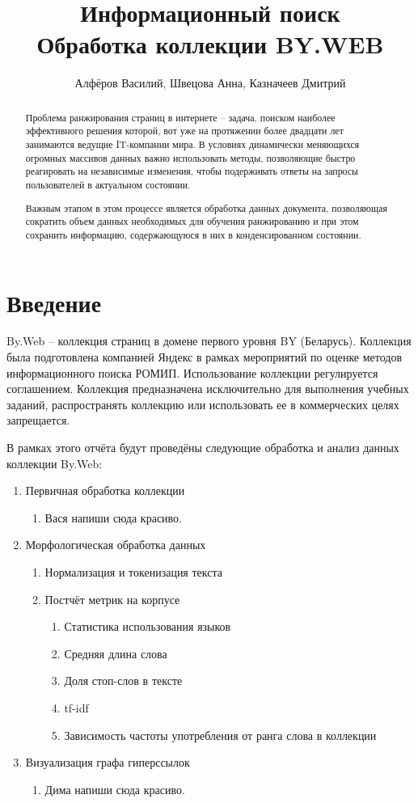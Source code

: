 \documentclass[twocolumn]{article}
\title{Информационный поиск\\ Обработка коллекции BY.WEB}
\author{Алфёров Василий, Швецова Анна, Казначеев Дмитрий}
\begin{document}
\maketitle        

\begin{abstract}
	Проблема ранжирования страниц в интернете -- задача, поиском наиболее эффективного решения которой, вот уже на протяжении более двадцати лет занимаются ведущие IT-компании мира. В условиях динамически меняющихся огромных массивов данных важно использовать методы, позволяющие быстро реагировать на независимые изменения, чтобы подерживать ответы на запросы пользователей в актуальном состоянии. 
	
	Важным этапом в этом процессе является обработка данных документа, позволяющая сократить объем данных необходимых для обучения ранжированию и при этом сохранить информацию, содержающуюся в них в конденсированном состоянии. 
\end{abstract}

\section{Введение}

By.Web -- коллекция страниц в домене первого уровня BY (Беларусь). Коллекция была подготовлена компанией Яндекс в рамках мероприятий по оценке методов информационного поиска РОМИП. Использование коллекции регулируется соглашением. Коллекция предназначена исключительно для выполнения учебных заданий, распространять коллекцию или использовать ее в коммерческих целях запрещается.	

В рамках этого отчёта будут проведёны следующие обработка и анализ данных коллекции By.Web:

\begin{enumerate}
	\item Первичная обработка коллекции
	\begin{enumerate}
		\item {\color{red} Вася напиши сюда красиво.}
	\end{enumerate}
	\item Морфологическая обработка данных
	\begin{enumerate}
		\item Нормализация и токенизация текста 
		\item Постчёт метрик на корпусе
		\begin{enumerate}
			\item Статистика использования языков
			\item Средняя длина слова
			\item Доля стоп-слов в тексте
			\item tf-idf
			\item Зависимость частоты употребления от ранга слова в коллекции 
		\end{enumerate}
	\end{enumerate}
	\item Визуализация графа гиперссылок
	\begin{enumerate}
		\item {\color{red} Дима напиши сюда красиво.}
	\end{enumerate}
\end{enumerate}






\end{document}
